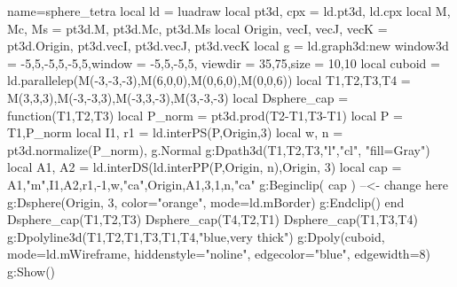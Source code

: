\documentclass[tikz]{standalone}
\begin{document}
\begin{luadraw}{name=sphere_tetra}
local ld = luadraw
local pt3d, cpx = ld.pt3d, ld.cpx
local M, Mc, Ms = pt3d.M, pt3d.Mc, pt3d.Ms
local Origin, vecI, vecJ, vecK = pt3d.Origin, pt3d.vecI, pt3d.vecJ, pt3d.vecK
local g = ld.graph3d:new{
    window3d = {-5,5,-5,5,-5,5},window = {-5,5,-5,5},
    viewdir = {35,75},size = {10,10}
}
local cuboid = ld.parallelep(M(-3,-3,-3),M(6,0,0),M(0,6,0),M(0,0,6))
local T1,T2,T3,T4 = M(3,3,3),M(-3,-3,3),M(-3,3,-3),M(3,-3,-3)
local Dsphere_cap = function(T1,T2,T3)
    local P_norm = pt3d.prod(T2-T1,T3-T1)
    local P = {T1,P_norm}
    local I1, r1 = ld.interPS(P,{Origin,3})
    local w, n = pt3d.normalize(P_norm), g.Normal
    g:Dpath3d({T1,T2,T3,"l","cl"}, "fill=Gray")
    local A1, A2 = ld.interDS(ld.interPP(P,{Origin, n}),{Origin, 3})
    local cap = {A1,"m",I1,A2,r1,-1,w,"ca",Origin,A1,3,1,n,"ca"}
    g:Beginclip( cap ) --<- change here
        g:Dsphere(Origin, 3, {color="orange", mode=ld.mBorder})
    g:Endclip()
end
Dsphere_cap(T1,T2,T3)
Dsphere_cap(T4,T2,T1) 
Dsphere_cap(T1,T3,T4)
g:Dpolyline3d({{T1,T2},{T1,T3},{T1,T4}},"blue,very thick")
g:Dpoly(cuboid, {mode=ld.mWireframe, hiddenstyle="noline", edgecolor="blue", edgewidth=8})
g:Show()
\end{luadraw}
\end{document}
